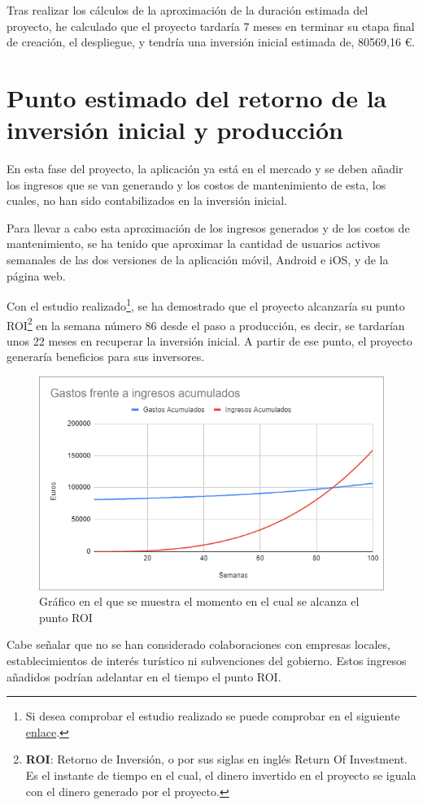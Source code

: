 Tras realizar los cálculos de la aproximación de la duración estimada del proyecto, he calculado que el proyecto tardaría 7 meses en terminar su etapa final de creación, el despliegue, y tendría una inversión inicial estimada de, 80569,16 €.

\section{Punto estimado del retorno de la inversión inicial y producción}

En esta fase del proyecto, la aplicación ya está en el mercado y se deben añadir los ingresos que se van generando y los costos de mantenimiento de esta, los cuales, no han sido contabilizados en la inversión inicial.

Para llevar a cabo esta aproximación de los ingresos generados y de los costos de mantenimiento, se ha tenido que aproximar la cantidad de usuarios activos semanales de las dos versiones de la aplicación móvil, Android e iOS, y de la página web.



Con el estudio realizado\footnote{Si desea comprobar el estudio realizado se puede comprobar en el siguiente \href{https://docs.google.com/spreadsheets/d/1Xp9dhk1jerlhGhqqkd2Uu2R6KGxOjXPJQnaUy1ktfSA/edit?usp=sharing}{enlace}.}, se ha demostrado que el proyecto alcanzaría su punto ROI\footnote{\textbf{ROI}: Retorno de Inversión, o por sus siglas en inglés Return Of Investment. Es el instante de tiempo en el cual, el dinero invertido en el proyecto se iguala con el dinero generado por el proyecto.} en la semana número 86 desde el paso a producción, es decir, se tardarían unos 22 meses en recuperar la inversión inicial. A partir de ese punto, el proyecto generaría beneficios para sus inversores. 

\begin{figure}[H]
    \centering
    \includegraphics[width=1\textwidth]{Memoria_TFG_LaTeX/images/puntoROI.png}
    \caption{Gráfico en el que se muestra el momento en el cual se alcanza el punto ROI}
    \label{fig:puntoROI}
\end{figure}

Cabe señalar que no se han considerado colaboraciones con empresas locales, establecimientos de interés turístico ni subvenciones del gobierno. Estos ingresos añadidos podrían adelantar en el tiempo el punto ROI.